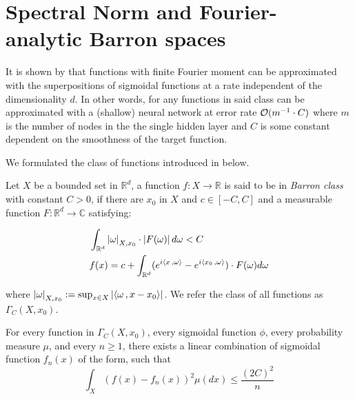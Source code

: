 \section{Spectral Norm and Fourier-analytic Barron spaces}
\label{sec:spectral_norm}

It is shown by \cite{barronUniversalApproximationBounds1993} that functions with
finite Fourier moment can be approximated with the superpositions of sigmoidal
functions at a rate independent of the dimensionality $d$. In other words, for
any functions in said class can be approximated with a (shallow) neural network
at error rate $\mathcal{O}(m^{-1} \cdot C)$ where $m$ is the number of nodes in the
the single hidden layer and $C$ is some constant dependent on the smoothness of
the target function.

We formulated the class of functions introduced in
\cite{barronNeuralNetApproximation1992, barronUniversalApproximationBounds1993}
below.

\begin{definition}
    Let $X$ be a bounded set in $\mathbb{R}^d$, a function $f: X \to \mathbb{R}$
    is said to be in \textit{Barron class} with constant $C > 0$, if there are
    $x_0$ in $X$ and $c \in [-C, C]$ and a measurable function $F: \mathbb{R}^d
        \to \mathbb{C}$ satisfying:

    \begin{align}
         & \int_{\mathbb{R}^d} \left| \omega \right|_{X, x_0} \cdot \left| F(\omega) \right| d\omega < C                            \\
         & f(x) = c + \int_{\mathbb{R}^d} (e^{i\left\langle x\, , \omega \right\rangle} - e^{i\left\langle x_0\, , \omega \right\rangle}) \cdot F(\omega) d\omega
    \end{align}

    where $\left| \omega \right|_{X, x_0} := \sup_{x\in X}\left| \left\langle \omega\, , x - x_0 \right\rangle \right|$.
    We refer the class of all functions as $\Gamma_C(X, x_0)$.
\end{definition}

\begin{theorem}\cite[Theorem~1]{barronUniversalApproximationBounds1993}\label{thm:barron_1993_1}
    For every function in $\Gamma_C(X, x_0)$, every sigmoidal function $\phi$,
    every probability measure $\mu$, and every $n \geq 1$, there exists a linear
    combination of sigmoidal function $f_n(x)$ of the form, such that
    \begin{equation}
        \int_X(f(x) - f_n(x))^2 \mu(dx) \leq \frac{(2C)^2}{n}
    \end{equation}
\end{theorem}



